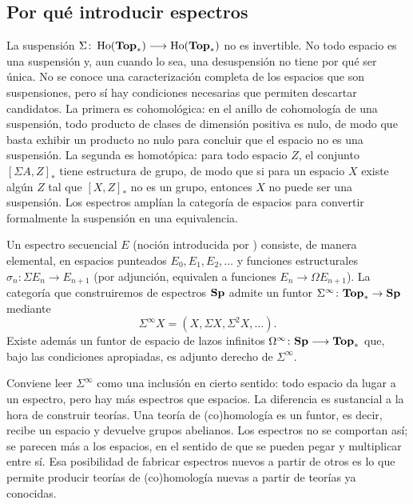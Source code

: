 \subsection{Por qué introducir espectros}
La suspensión $\Sigma\colon\operatorname{Ho}(\mathbf{Top}_*)\longrightarrow\operatorname{Ho}(\mathbf{Top}_*)$ no es invertible. No todo espacio es una suspensión y, aun cuando lo sea, una desuspensión no tiene por qué ser única.
No se conoce una caracterización completa de los espacios que son suspensiones, pero sí hay condiciones necesarias que permiten descartar candidatos. La primera es cohomológica: en el anillo de cohomología de una suspensión, todo producto de clases de dimensión positiva es nulo, de modo que basta exhibir un producto no nulo para concluir que el espacio no es una suspensión. La segunda es homotópica: para todo espacio \(Z\), el conjunto \([\Sigma A,Z]_*\) tiene estructura de grupo, de modo que si para un espacio \(X\) existe algún \(Z\) tal que \([X,Z]_*\) no es un grupo, entonces \(X\) no puede ser una suspensión.
Los espectros amplían la categoría de espacios para convertir formalmente la suspensión en una equivalencia.

Un espectro secuencial \(E\) (noción introducida por \cite{lima1959}) consiste, de manera elemental, en espacios punteados $E_0,E_1,E_2,\ldots$ y funciones estructurales $\sigma_n\colon\Sigma E_n\longrightarrow E_{n+1}$
(por adjunción, equivalen a funciones $E_n\longrightarrow\Omega E_{n+1}$).
La categoría que construiremos de espectros $\mathbf{Sp}$ admite un funtor $\Sigma^\infty \colon \mathbf{Top}_* \to\mathbf{Sp}$ mediante
\[
\Sigma^\infty X=(X,\Sigma X,\Sigma^2X,\ldots).
\]
Existe además un funtor de espacio de lazos infinitos $\Omega^\infty\colon\mathbf{Sp}\longrightarrow\mathbf{Top}_*$ que, bajo las condiciones apropiadas, es adjunto derecho de \(\Sigma^\infty\).

Conviene leer \(\Sigma^\infty\) como una inclusión en cierto sentido: todo espacio da lugar a un espectro, pero hay más espectros que espacios. La diferencia es sustancial a la hora de construir teorías. Una teoría de (co)homología es un funtor, es decir, recibe un espacio y devuelve grupos abelianos. Los espectros no se comportan así; se parecen más a los espacios, en el sentido de que se pueden pegar y multiplicar entre sí. Esa posibilidad de fabricar espectros nuevos a partir de otros es lo que permite producir teorías de (co)homología nuevas a partir de teorías ya conocidas.

